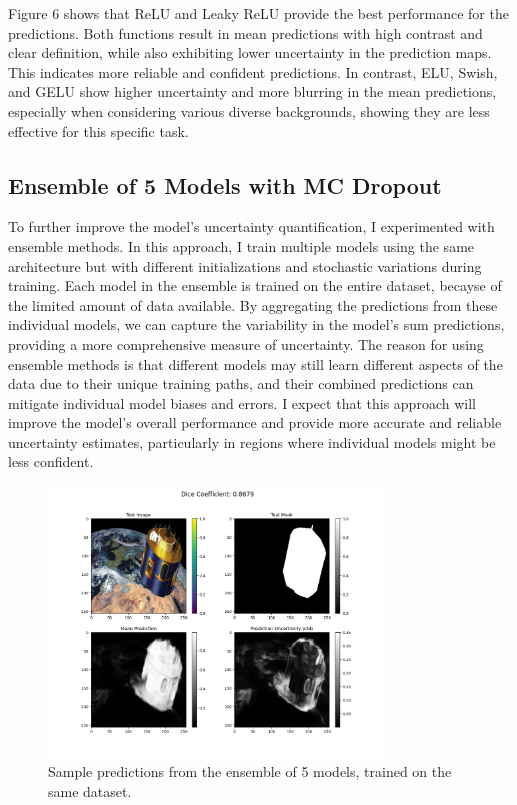 \documentclass{article}
\begin{document}
Figure 6 shows that ReLU and Leaky ReLU provide the best performance for the predictions. Both functions result in mean 
predictions with high contrast and clear definition, while also exhibiting lower uncertainty in the prediction maps. 
This indicates more reliable and confident predictions. In contrast, ELU, 
Swish, and GELU show higher uncertainty and more blurring in the mean predictions, especially when considering various 
diverse backgrounds, showing they are less effective for this specific task.

\subsection{Ensemble of 5 Models with MC Dropout}

To further improve the model's uncertainty quantification, I experimented with ensemble methods. In this approach, I train 
multiple models using the same architecture but with different initializations and stochastic variations during training. 
Each model in the ensemble is trained on the entire dataset, becayse of the limited amount of data available. By aggregating 
the predictions from these individual models, we can capture the variability in the model's sum predictions, providing a more 
comprehensive measure of uncertainty. The reason for using ensemble methods is that different models may still learn  
different aspects of the data due to their unique training paths, and their combined predictions can mitigate 
individual model biases and errors. I expect that this approach will improve the model's overall performance and provide 
more accurate and reliable uncertainty estimates, particularly in regions where individual models might be less confident. 

\begin{figure}[h]
    \centering
    \includegraphics[width=0.8\textwidth]{../images/ensemble method/prediction.png}
    \caption{Sample predictions from the ensemble of 5 models, trained on the same dataset.}
    \label{fig:ensemble_predictions}
\end{figure}
\end{document}
